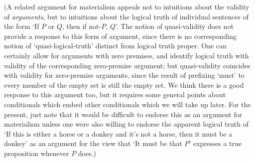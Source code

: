 \documentclass[If.tex]{subfiles}
\begin{document}
(A related argument for materialism appeals not to intuitions about the validity of \emph{arguments}, but to intuitions about the logical truth of individual sentences of the form ‘If $P$ or $Q$, then if not-$P$, $Q$’. The notion of quasi-validity does not provide a response to this form of argument, since there is no corresponding notion of ‘quasi-logical-truth’ distinct from logical truth proper.  One can certainly allow for arguments with zero premises, and identify logical truth with validity of the corresponding zero-premise argument; but quasi-validity coincides with validity for zero-premise arguments, since the result of prefixing ‘must’ to every member of the empty set is still the empty set.  We think there is a good response to this argument too, but it requires some general points about conditionals which embed other conditionals which we will take up later.  
For the present, just note that it would be difficult to endorse this as an argument for materialism unless one were also willing to endorse the apparent logical truth of ‘If this is either a horse or a donkey and it's not a horse, then it must be a donkey’ as an argument for the view that ‘It must be that $P$’ expresses a true proposition whenever $P$ does.)
\end{document}
